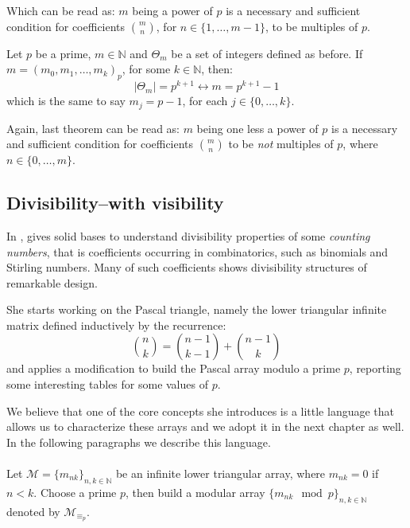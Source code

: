 Which can be read as: \flqq $m$ being a power of $p$ is a necessary and 
sufficient condition for coefficients ${{m}\choose{n}}$, for $n\in\lbrace1,\ldots,m-1\rbrace$, 
    to be multiples of $p$\frqq.
\begin{theorem}
    Let $p$ be a prime, $m\in\mathbb{N}$ and $\Theta_{m}$ 
    be a set of integers defined as before.
    If $m=\left(m_{0},m_{1},\ldots,m_{k}\right)_{p}$, for some $k\in\mathbb{N}$, then:
    \begin{displaymath}
        \left|\Theta_{m}\right|=p^{k+1}\leftrightarrow m=p^{k+1}-1
    \end{displaymath}
    which is the same to say $m_{j}=p-1$, for each $j\in\lbrace 0,\ldots,k\rbrace$.
\end{theorem}

Again, last theorem can be read as: \flqq $m$ being one less a power of $p$ is
a necessary and sufficient condition for coefficients ${{m}\choose{n}}$ to be
\emph{not} multiples of $p$, where $n\in\lbrace0,\ldots,m\rbrace$\frqq.


\subsection{Divisibility--with visibility}

In \cite{sved:1988}, \citeauthor{sved:1988} gives solid bases to understand
divisibility properties of some \emph{counting numbers}, that is coefficients
occurring in combinatorics, such as binomials and Stirling numbers. Many of
such coefficients shows divisibility structures of remarkable design. 

She starts working on the Pascal triangle, namely the lower triangular infinite
matrix defined inductively by the recurrence: 
\begin{equation}
    {{n}\choose{k}}={{n-1}\choose{k-1}}+{{n-1}\choose{k}}
    \label{eq:binomial:recurrence}
\end{equation}
and applies a modification to build the Pascal array modulo a prime $p$, 
reporting some interesting tables for some values of $p$.

We believe that one of the core concepts she introduces is a little language
that allows us to characterize these arrays and we adopt it in the next chapter
as well. In the following paragraphs we describe this language. 
\\\\
Let $\mathcal{M}=\lbrace m_{nk}\rbrace_{n,k\in\mathbb{N}}$ 
be an infinite lower triangular array, where $m_{nk}=0$ if 
$n<k$. Choose a prime $p$, then build a modular array
$\lbrace m_{nk}\mod p\rbrace_{n,k\in\mathbb{N}}$ denoted by $\mathcal{M}_{\equiv_{p}}$.

